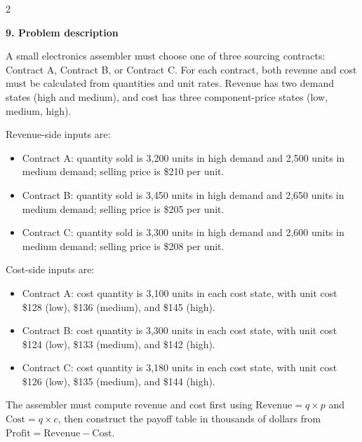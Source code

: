\documentclass[12pt]{article}
\newcommand{\SubsectionBox}[1]{%
	\noindent\colorbox{gray!30}{%
		\parbox{\linewidth}{\textbf{#1}}%
	}\par\vspace{0.35cm}%
}
\begin{document}
\begin{multicols}{2}
		\vspace{0.25cm}
		\SubsectionBox{9. Problem description}\vspace{-0.25cm}
		A small electronics assembler must choose one of three sourcing contracts: Contract A, Contract B, or Contract C.
				For each contract, both revenue and cost must be calculated from quantities and unit rates.
				Revenue has two demand states (high and medium), and cost has three component-price states (low, medium, high).
				
				Revenue-side inputs are:
				\begin{itemize}
					\item Contract A: quantity sold is 3{,}200 units in high demand and 2{,}500 units in medium demand; selling price is \$210 per unit.
					\item Contract B: quantity sold is 3{,}450 units in high demand and 2{,}650 units in medium demand; selling price is \$205 per unit.
					\item Contract C: quantity sold is 3{,}300 units in high demand and 2{,}600 units in medium demand; selling price is \$208 per unit.
				\end{itemize}
				Cost-side inputs are:
				\begin{itemize}
					\item Contract A: cost quantity is 3{,}100 units in each cost state, with unit cost \$128 (low), \$136 (medium), and \$145 (high).
					\item Contract B: cost quantity is 3{,}300 units in each cost state, with unit cost \$124 (low), \$133 (medium), and \$142 (high).
					\item Contract C: cost quantity is 3{,}180 units in each cost state, with unit cost \$126 (low), \$135 (medium), and \$144 (high).
				\end{itemize}
				
				The assembler must compute revenue and cost first using
				\(\text{Revenue}=q\times p\) and \(\text{Cost}=q\times c\), then construct the payoff table in thousands of dollars from
				\(\text{Profit}=\text{Revenue}-\text{Cost}\).

\end{multicols}
\end{document}
